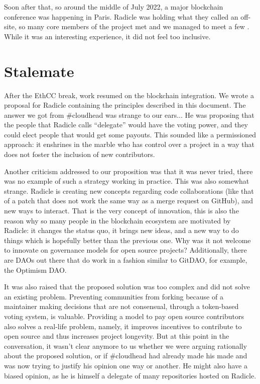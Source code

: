 Soon after that, so around the middle of July 2022, a major blockchain conference was happening in Paris.
Radicle was holding what they called an off-site, so many core members of the project met and we managed to meet a few%
.
While it was an interesting experience, it did not feel too inclusive.

\section{Stalemate}

After the EthCC break, work resumed on the blockchain integration.
We wrote a proposal for Radicle containing the principles described in this document.
The answer we got from \#cloudhead was strange to our ears...
He was proposing that the people that Radicle calls \enquote{delegate}%
 would have the voting power, and they could elect people that would get some payouts.
This sounded like a permissioned approach: it enshrines in the marble who has control over a project in a way that does not foster the inclusion of new contributors.

Another criticism addressed to our proposition was that it was never tried, there was no example of such a strategy working in practice.
This was also somewhat strange.
Radicle is creating new concepts regarding code collaborations (like that of a patch that does not work the same way as a merge request on GitHub), and new ways to interact.
That is the very concept of innovation, this is also the reason why so many people in the blockchain ecosystem are motivated by Radicle: it changes the status quo, it brings new ideas, and a new way to do things which is hopefully better than the previous one.
Why was it not welcome to innovate on governance models for open source projects?
Additionally, there are DAOs out there that do work in a fashion similar to GitDAO, for example, the Optimism DAO.

It was also raised that the proposed solution was too complex and did not solve an existing problem.
Preventing communities from forking because of a maintainer making decisions that are not consensual, through a token-based voting system, is valuable.
Providing a model to pay open source contributors also solves a real-life problem, namely, it improves incentives to contribute to open source and thus increases project longevity.
But at this point in the conversation, it wasn't clear anymore to us whether we were arguing rationally about the proposed solution, or if \#cloudhead had already made his made and was now trying to justify his opinion one way or another.
He might also have a biased opinion, as he is himself a delegate of many repositories hosted on Radicle.

